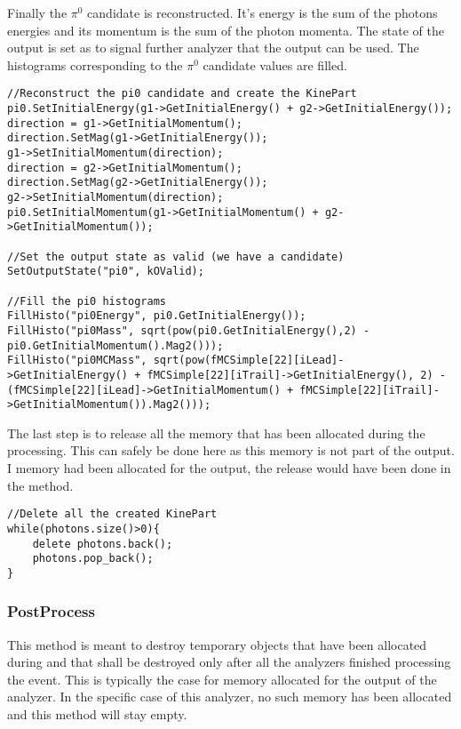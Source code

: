 Finally the $\pi^0$ candidate is reconstructed. It's energy is the sum of the photons energies and
its momentum  is the sum of the photon momenta. The state of the output is set as 
to signal further analyzer that the output can be used. The histograms corresponding to the $\pi^0$
candidate values are filled.
\begin{lstlisting}
//Reconstruct the pi0 candidate and create the KinePart
pi0.SetInitialEnergy(g1->GetInitialEnergy() + g2->GetInitialEnergy());
direction = g1->GetInitialMomentum();
direction.SetMag(g1->GetInitialEnergy());
g1->SetInitialMomentum(direction);
direction = g2->GetInitialMomentum();
direction.SetMag(g2->GetInitialEnergy());
g2->SetInitialMomentum(direction);
pi0.SetInitialMomentum(g1->GetInitialMomentum() + g2->GetInitialMomentum());

//Set the output state as valid (we have a candidate)
SetOutputState("pi0", kOValid);

//Fill the pi0 histograms
FillHisto("pi0Energy", pi0.GetInitialEnergy());
FillHisto("pi0Mass", sqrt(pow(pi0.GetInitialEnergy(),2) - pi0.GetInitialMomentum().Mag2()));
FillHisto("pi0MCMass", sqrt(pow(fMCSimple[22][iLead]->GetInitialEnergy() + fMCSimple[22][iTrail]->GetInitialEnergy(), 2) - (fMCSimple[22][iLead]->GetInitialMomentum() + fMCSimple[22][iTrail]->GetInitialMomentum()).Mag2()));
\end{lstlisting}


The last step is to release all the memory that has been allocated during the processing. This can
safely be done here as this memory is not part of the output. I memory had been allocated for the
output, the release would have been done in the  method.
\begin{lstlisting}
//Delete all the created KinePart
while(photons.size()>0){
	delete photons.back();
	photons.pop_back();
}
\end{lstlisting}

\subsubsection{PostProcess}
This method is meant to destroy temporary objects that have been allocated during 
and that shall be destroyed only after all the analyzers finished processing the event. This is
typically the case for memory allocated for the output of the analyzer. In the specific case of this
analyzer, no such memory has been allocated and this method will stay empty.

